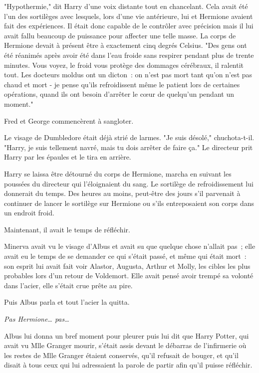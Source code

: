 "Hypothermie," dit Harry d'une voix distante tout en chancelant. Cela avait été l'un des sortilèges avec lesquels, lors d'une vie antérieure, lui et Hermione avaient fait des expériences. Il était donc capable de le contrôler avec précision mais il lui avait fallu beaucoup de puissance pour affecter une telle masse. La corps de Hermione devait à présent être à exactement cinq degrés Celsius. "Des gens ont été réanimés après avoir été dans l'eau froide sans respirer pendant plus de trente minutes. Vous voyez, le froid vous protège des dommages cérébraux, il ralentit tout. Les docteurs moldus ont un dicton~: on n'est pas mort tant qu'on n'est pas chaud et mort - je pense qu'ils refroidissent même le patient lors de certaines opérations, quand ils ont besoin d'arrêter le cœur de quelqu'un pendant un moment."

Fred et George commencèrent à sangloter.

Le visage de Dumbledore était déjà strié de larmes. "Je suis désolé," chuchota-t-il. "Harry, je suis tellement navré, mais tu dois arrêter de faire ça." Le directeur prit Harry par les épaules et le tira en arrière.

Harry se laissa être détourné du corps de Hermione, marcha en suivant les poussées du directeur qui l'éloignaient du sang. Le sortilège de refroidissement lui donnerait du temps. Des heures au moins, peut-être des jours s'il parvenait à continuer de lancer le sortilège sur Hermione ou s'ils entreposaient son corps dans un endroit froid.

Maintenant, il avait le temps de réfléchir.

\later

Minerva avait vu le visage d'Albus et avait su que quelque chose n'allait pas~; elle avait eu le temps de se demander ce qui s'était passé, et même qui était mort~: son esprit lui avait fait voir Alastor, Augusta, Arthur et Molly, les cibles les plus probables lors d'un retour de Voldemort. Elle avait pensé avoir trempé sa volonté dans l'acier, elle s'était crue prête au pire.

Puis Albus parla et tout l'acier la quitta.

\emph{Pas Hermione… pas…}

Albus lui donna un bref moment pour pleurer puis lui dit que Harry Potter, qui avait vu Mlle Granger mourir, s'était assis devant le débarras de l'infirmerie où les restes de Mlle Granger étaient conservés, qu'il refusait de bouger, et qu'il disait à tous ceux qui lui adressaient la parole de partir afin qu'il puisse réfléchir.

